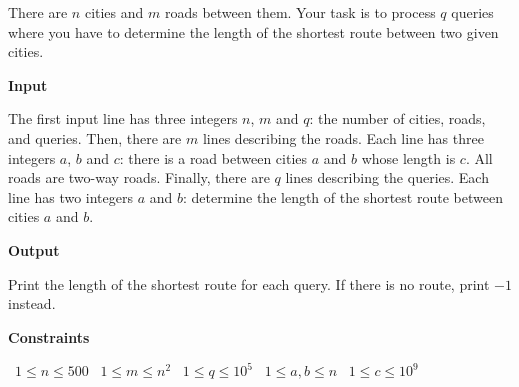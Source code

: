 There are $n$ cities and $m$ roads between them. Your task is to process $q$ queries where you have to determine the length of the shortest route between two given cities.

\vspace{0.3cm}\noindent\textbf{Input}

The first input line has three integers $n$, $m$ and $q$: the number of cities, roads, and queries.
Then, there are $m$ lines describing the roads. Each line has three integers $a$, $b$ and $c$: there is a road between cities $a$ and $b$ whose length is $c$. All roads are two-way roads.
Finally, there are $q$ lines describing the queries. Each line has two integers $a$ and $b$: determine the length of the shortest route between cities $a$ and $b$.

\vspace{0.3cm}\noindent\textbf{Output}

Print the length of the shortest route for each query. If there is no route, print $-1$ instead.

\vspace{0.3cm}\noindent\textbf{Constraints}

\textbullet\ $1 \le n \le 500$
\textbullet\ $1 \le m \le n^2$
\textbullet\ $1 \le q \le 10^5$
\textbullet\ $1 \le a,b \le n$
\textbullet\ $1 \le c \le 10^9$